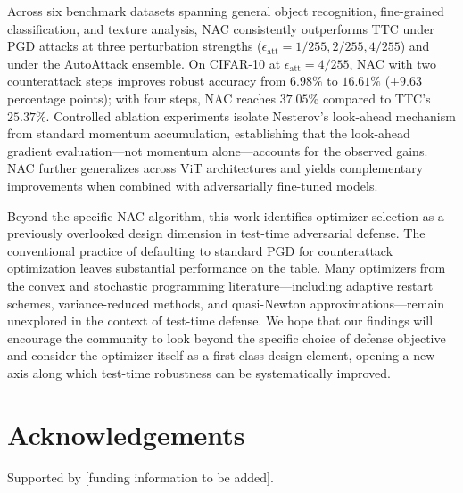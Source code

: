 \documentclass[12pt,a4paper]{article}
\begin{document}
Across six benchmark datasets spanning general object recognition, fine-grained classification, and texture analysis, NAC consistently outperforms TTC under PGD attacks at three perturbation strengths ($\epsilon_{\text{att}} = 1/255, 2/255, 4/255$) and under the AutoAttack ensemble. On CIFAR-10 at $\epsilon_{\text{att}}=4/255$, NAC with two counterattack steps improves robust accuracy from $6.98\%$ to $16.61\%$ ($+9.63$ percentage points); with four steps, NAC reaches $37.05\%$ compared to TTC's $25.37\%$. Controlled ablation experiments isolate Nesterov's look-ahead mechanism from standard momentum accumulation, establishing that the look-ahead gradient evaluation---not momentum alone---accounts for the observed gains. NAC further generalizes across ViT architectures and yields complementary improvements when combined with adversarially fine-tuned models.

Beyond the specific NAC algorithm, this work identifies optimizer selection as a previously overlooked design dimension in test-time adversarial defense. The conventional practice of defaulting to standard PGD for counterattack optimization leaves substantial performance on the table. Many optimizers from the convex and stochastic programming literature---including adaptive restart schemes, variance-reduced methods, and quasi-Newton approximations---remain unexplored in the context of test-time defense. We hope that our findings will encourage the community to look beyond the specific choice of defense objective and consider the optimizer itself as a first-class design element, opening a new axis along which test-time robustness can be systematically improved.

\section*{Acknowledgements}
Supported by [funding information to be added].
\end{document}
